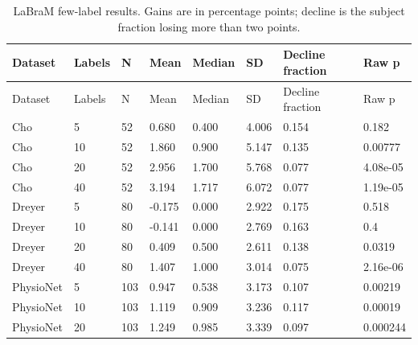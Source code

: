 \begin{longtable}{llllllll}
\caption{LaBraM few-label results. Gains are in percentage points; decline is the subject fraction losing more than two points.}\label{tab:cross_few_labram}\\
\toprule
Dataset & Labels & N & Mean & Median & SD & Decline fraction & Raw p \\
\midrule
\endfirsthead
\toprule
Dataset & Labels & N & Mean & Median & SD & Decline fraction & Raw p \\
\midrule
\endhead
Cho & 5 & 52 & 0.680 & 0.400 & 4.006 & 0.154 & 0.182 \\
Cho & 10 & 52 & 1.860 & 0.900 & 5.147 & 0.135 & 0.00777 \\
Cho & 20 & 52 & 2.956 & 1.700 & 5.768 & 0.077 & 4.08e-05 \\
Cho & 40 & 52 & 3.194 & 1.717 & 6.072 & 0.077 & 1.19e-05 \\
Dreyer & 5 & 80 & -0.175 & 0.000 & 2.922 & 0.175 & 0.518 \\
Dreyer & 10 & 80 & -0.141 & 0.000 & 2.769 & 0.163 & 0.4 \\
Dreyer & 20 & 80 & 0.409 & 0.500 & 2.611 & 0.138 & 0.0319 \\
Dreyer & 40 & 80 & 1.407 & 1.000 & 3.014 & 0.075 & 2.16e-06 \\
PhysioNet & 5 & 103 & 0.947 & 0.538 & 3.173 & 0.107 & 0.00219 \\
PhysioNet & 10 & 103 & 1.119 & 0.909 & 3.236 & 0.117 & 0.00019 \\
PhysioNet & 20 & 103 & 1.249 & 0.985 & 3.339 & 0.097 & 0.000244 \\
\bottomrule
\end{longtable}
